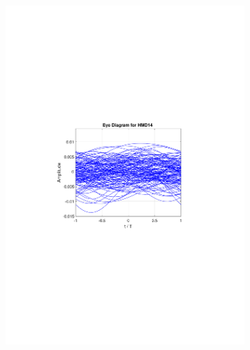 \begin{figure}
	\centering
	\begin{subfigure}{.5\textwidth}
		\centering
		\includegraphics[clip, trim=5cm 10cm 5cm 10cm, width=\textwidth]{./sdf/m_qam_system/figures/HMD14_eye_diagram_140.pdf}
	\end{subfigure}%
	\begin{subfigure}{.5\textwidth}
		\centering

\end{subfigure}
\end{figure}

